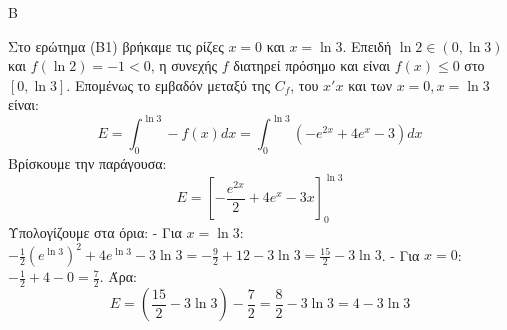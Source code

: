\begin{thema}{Β}
\begin{erwthma}
\item Στο ερώτημα (Β1) βρήκαμε τις ρίζες $x=0$ και $x=\ln 3$. Επειδή $\ln 2 \in (0, \ln 3)$ και $f(\ln 2)=-1 < 0$, η συνεχής $f$ διατηρεί πρόσημο και είναι $f(x) \le 0$ στο $[0, \ln 3]$.
Επομένως το εμβαδόν μεταξύ της $C_f$, του $x'x$ και των $x=0, x=\ln 3$ είναι:
\[ E = \int_0^{\ln 3} -f(x) dx = \int_0^{\ln 3} (-e^{2x} + 4e^x - 3) dx \]
Βρίσκουμε την παράγουσα:
\[ E = \left[ -\frac{e^{2x}}{2} + 4e^x - 3x \right]_0^{\ln 3} \]
Υπολογίζουμε στα όρια:
- Για $x=\ln 3$: $-\frac{1}{2}(e^{\ln 3})^2 + 4e^{\ln 3} - 3\ln 3 = -\frac{9}{2} + 12 - 3\ln 3 = \frac{15}{2} - 3\ln 3$.
- Για $x=0$: $-\frac{1}{2} + 4 - 0 = \frac{7}{2}$.
Άρα:
\[ E = \left( \frac{15}{2} - 3\ln 3 \right) - \frac{7}{2} = \frac{8}{2} - 3\ln 3 = 4 - 3\ln 3 \]
\end{erwthma}
\end{thema}

